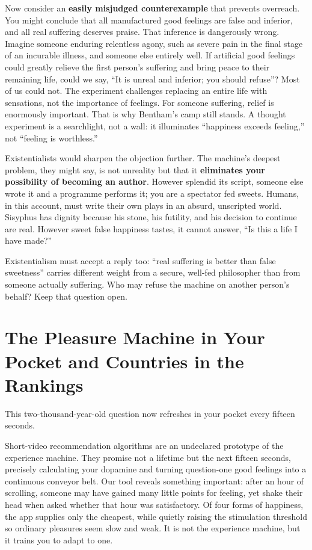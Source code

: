 Now consider an \textbf{easily misjudged counterexample} that prevents overreach. You might conclude that all manufactured good feelings are false and inferior, and all real suffering deserves praise. That inference is dangerously wrong. Imagine someone enduring relentless agony, such as severe pain in the final stage of an incurable illness, and someone else entirely well. If artificial good feelings could greatly relieve the first person's suffering and bring peace to their remaining life, could we say, ``It is unreal and inferior; you should refuse''? Most of us could not. The experiment challenges replacing an entire life with sensations, not the importance of feelings. For someone suffering, relief is enormously important. That is why Bentham's camp still stands. A thought experiment is a searchlight, not a wall: it illuminates ``happiness exceeds feeling,'' not ``feeling is worthless.''

Existentialists would sharpen the objection further. The machine's deepest problem, they might say, is not unreality but that it \textbf{eliminates your possibility of becoming an author}. However splendid its script, someone else wrote it and a programme performs it; you are a spectator fed sweets. Humans, in this account, must write their own plays in an absurd, unscripted world. Sisyphus has dignity because his stone, his futility, and his decision to continue are real. However sweet false happiness tastes, it cannot answer, ``Is this a life I have made?''

Existentialism must accept a reply too: ``real suffering is better than false sweetness'' carries different weight from a secure, well-fed philosopher than from someone actually suffering. Who may refuse the machine on another person's behalf? Keep that question open.

\section[Pocket Machines and National Rankings]{The Pleasure Machine in Your Pocket and Countries in the Rankings}
This two-thousand-year-old question now refreshes in your pocket every fifteen seconds.

Short-video recommendation algorithms are an undeclared prototype of the experience machine. They promise not a lifetime but the next fifteen seconds, precisely calculating your dopamine and turning question-one good feelings into a continuous conveyor belt. Our tool reveals something important: after an hour of scrolling, someone may have gained many little points for feeling, yet shake their head when asked whether that hour was satisfactory. Of four forms of happiness, the app supplies only the cheapest, while quietly raising the stimulation threshold so ordinary pleasures seem slow and weak. It is not the experience machine, but it trains you to adapt to one.

